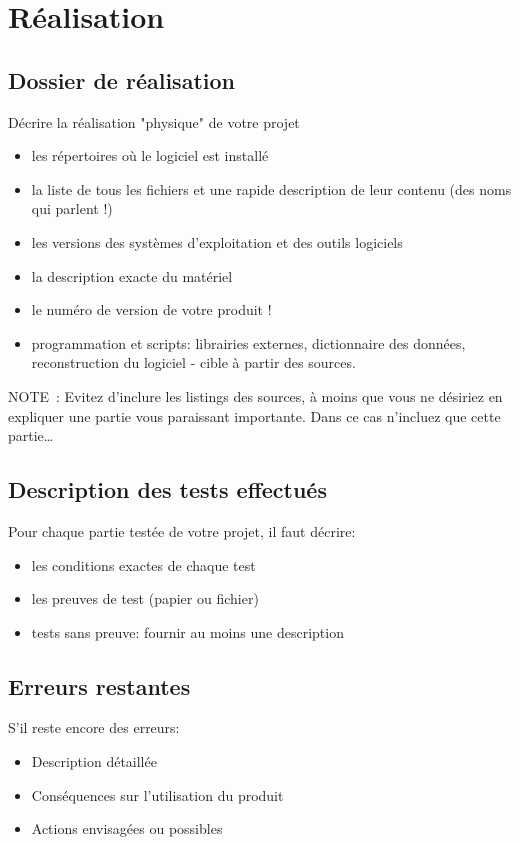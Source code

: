 \chapter{Réalisation}
\section{Dossier de réalisation}
Décrire la réalisation "physique" de votre projet
\begin{itemize}
  \item les répertoires où le logiciel est installé
  \item la liste de tous les fichiers et une rapide description de leur contenu (des noms qui parlent !)
  \item les versions des systèmes d'exploitation et des outils logiciels
  \item la description exacte du matériel
  \item le numéro de version de votre produit !
  \item programmation et scripts: librairies externes, dictionnaire des données, reconstruction du logiciel - cible à partir des sources.
\end{itemize}
NOTE : Evitez d’inclure les listings des sources, à moins que vous ne désiriez en expliquer une partie vous paraissant importante. Dans ce cas n’incluez que cette partie…

\section{Description des tests effectués}
Pour chaque partie testée de votre projet, il faut décrire:
\begin{itemize}
  \item les conditions exactes de chaque test
  \item les preuves de test (papier ou fichier)
  \item tests sans preuve: fournir au moins une description 
\end{itemize}

\section{Erreurs restantes}
S'il reste encore des erreurs: 
\begin{itemize}
  \item Description détaillée
  \item Conséquences sur l'utilisation du produit
  \item Actions envisagées ou possibles
\end{itemize}

